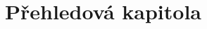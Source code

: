 \documentclass[12pt,a4paper]{article}
\begin{document}
\pagestyle{empty}
\noindent


\section{Přehledová kapitola}
\end{document}
